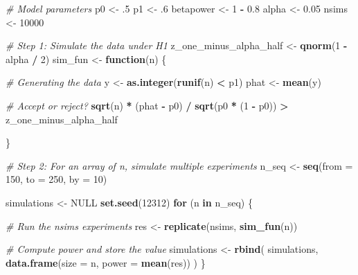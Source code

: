\documentclass[
]{book}
\newenvironment{Shaded}{\begin{snugshade}}{\end{snugshade}}
\newcommand{\AttributeTok}[1]{\textcolor[rgb]{0.13,0.29,0.53}{#1}}
\newcommand{\CommentTok}[1]{\textcolor[rgb]{0.56,0.35,0.01}{\textit{#1}}}
\newcommand{\ConstantTok}[1]{\textcolor[rgb]{0.56,0.35,0.01}{#1}}
\newcommand{\ControlFlowTok}[1]{\textcolor[rgb]{0.13,0.29,0.53}{\textbf{#1}}}
\newcommand{\DecValTok}[1]{\textcolor[rgb]{0.00,0.00,0.81}{#1}}
\newcommand{\FloatTok}[1]{\textcolor[rgb]{0.00,0.00,0.81}{#1}}
\newcommand{\FunctionTok}[1]{\textcolor[rgb]{0.13,0.29,0.53}{\textbf{#1}}}
\newcommand{\NormalTok}[1]{#1}
\newcommand{\OtherTok}[1]{\textcolor[rgb]{0.56,0.35,0.01}{#1}}
\newcommand{\SpecialCharTok}[1]{\textcolor[rgb]{0.81,0.36,0.00}{\textbf{#1}}}
\begin{document}
\begin{Shaded}
\begin{Highlighting}[]
\CommentTok{\# Model parameters}
\NormalTok{p0        }\OtherTok{\textless{}{-}}\NormalTok{ .}\DecValTok{5}
\NormalTok{p1        }\OtherTok{\textless{}{-}}\NormalTok{ .}\DecValTok{6}
\NormalTok{betapower }\OtherTok{\textless{}{-}} \DecValTok{1} \SpecialCharTok{{-}} \FloatTok{0.8}
\NormalTok{alpha     }\OtherTok{\textless{}{-}} \FloatTok{0.05}
\NormalTok{nsims     }\OtherTok{\textless{}{-}} \DecValTok{10000}

\CommentTok{\# Step 1: Simulate the data under H1}
\NormalTok{z\_one\_minus\_alpha\_half }\OtherTok{\textless{}{-}} \FunctionTok{qnorm}\NormalTok{(}\DecValTok{1} \SpecialCharTok{{-}}\NormalTok{ alpha }\SpecialCharTok{/} \DecValTok{2}\NormalTok{)}
\NormalTok{sim\_fun }\OtherTok{\textless{}{-}} \ControlFlowTok{function}\NormalTok{(n) \{}

    \CommentTok{\# Generating the data}
\NormalTok{    y }\OtherTok{\textless{}{-}} \FunctionTok{as.integer}\NormalTok{(}\FunctionTok{runif}\NormalTok{(n) }\SpecialCharTok{\textless{}}\NormalTok{ p1)}
\NormalTok{    phat }\OtherTok{\textless{}{-}} \FunctionTok{mean}\NormalTok{(y)}

    \CommentTok{\# Accept or reject?}
    \FunctionTok{sqrt}\NormalTok{(n) }\SpecialCharTok{*}\NormalTok{ (phat }\SpecialCharTok{{-}}\NormalTok{ p0) }\SpecialCharTok{/} \FunctionTok{sqrt}\NormalTok{(p0 }\SpecialCharTok{*}\NormalTok{ (}\DecValTok{1} \SpecialCharTok{{-}}\NormalTok{ p0)) }\SpecialCharTok{\textgreater{}}
\NormalTok{        z\_one\_minus\_alpha\_half}

\NormalTok{\}}

\CommentTok{\# Step 2: For an array of n, simulate multiple experiments}
\NormalTok{n\_seq }\OtherTok{\textless{}{-}} \FunctionTok{seq}\NormalTok{(}\AttributeTok{from =} \DecValTok{150}\NormalTok{, }\AttributeTok{to =} \DecValTok{250}\NormalTok{, }\AttributeTok{by =} \DecValTok{10}\NormalTok{)}

\NormalTok{simulations }\OtherTok{\textless{}{-}} \ConstantTok{NULL}
\FunctionTok{set.seed}\NormalTok{(}\DecValTok{12312}\NormalTok{)}
\ControlFlowTok{for}\NormalTok{ (n }\ControlFlowTok{in}\NormalTok{ n\_seq) \{}

    \CommentTok{\# Run the nsims experiments}
\NormalTok{    res }\OtherTok{\textless{}{-}} \FunctionTok{replicate}\NormalTok{(nsims, }\FunctionTok{sim\_fun}\NormalTok{(n))}

    \CommentTok{\# Compute power and store the value}
\NormalTok{    simulations }\OtherTok{\textless{}{-}} \FunctionTok{rbind}\NormalTok{(}
\NormalTok{        simulations,}
        \FunctionTok{data.frame}\NormalTok{(}\AttributeTok{size =}\NormalTok{ n, }\AttributeTok{power =} \FunctionTok{mean}\NormalTok{(res))}
\NormalTok{    )}
\NormalTok{\}}


\end{Highlighting}
\end{Shaded}
\end{document}
